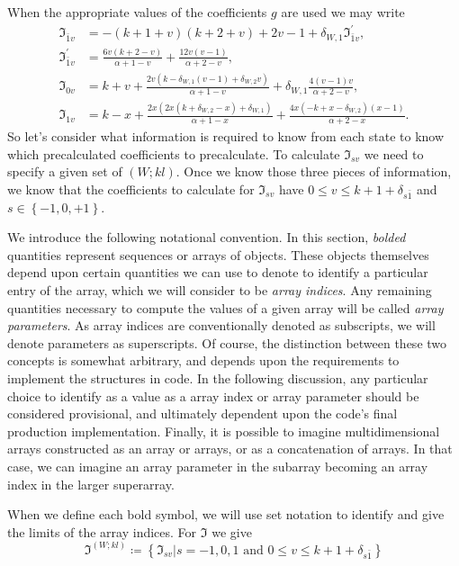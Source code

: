 When the appropriate values of the coefficients $g$ are used we may write
\begin{align}
\mathfrak{I}_{\bar{1}v}
    & =
        -(k+1+v)(k+2+v)+2v-1
        +
        \delta_{W,1}\mathfrak{I}_{\bar{1}v}^{\prime}
,\\
\mathfrak{I}_{\bar{1}v}^{\prime}
    & =
        \frac{6v(k+2-v)}{\alpha+1-v}
            +
        \frac{12v(v-1)}{\alpha+2-v}
,\\
\mathfrak{I}_{0v}
    & =
        k+v
            +
        \frac
        {2v\left(k-\delta_{W,1}\left(v-1\right)+\delta_{W,2}v\right)}
        {\alpha+1-v}
            +
        \delta_{W,1}\frac{4(v-1)v}{\alpha+2-v}
,\\
\mathfrak{I}_{1v}
    & =
        k-x
            +
        \frac{2x(2x(k+\delta_{W,2}-x)+\delta_{W,1})}{\alpha+1-x}
            +
        \frac{4x(-k+x-\delta_{W,2})(x-1)}{\alpha+2-x}
.
\end{align}
So let's consider what information is required to know from each state to know
which precalculated coefficients to precalculate. To calculate
$\mathfrak{I}_{sv}$ we need to specify a given set of $ \left(W;kl\right) $. Once
we know those three pieces of information, we know that the coefficients to
calculate for $\mathfrak{I}_{sv}$ have $ 0 \le v \le k + 1 + \delta_{s\bar{1}}$
and $ s \in \left\{-1,0,+1\right\}$.

We introduce the following notational convention. In this section, \emph{bolded}
quantities represent sequences or arrays of objects. These objects themselves
depend upon certain quantities we can use to denote to identify a particular
entry of the array, which we will consider to be \emph{array indices}. Any
remaining quantities necessary to compute the values of a given array will be
called \emph{array parameters}. As array indices are conventionally denoted as
subscripts, we will denote parameters as superscripts. Of course, the
distinction between these two concepts is somewhat arbitrary, and depends upon
the requirements to implement the structures in code. In the following
discussion, any particular choice to identify as a value as a array index or
array parameter should be considered provisional, and ultimately dependent upon
the code's final production implementation. Finally, it is possible to imagine
multidimensional arrays constructed as an array or arrays, or as a
concatenation of arrays. In that case, we can imagine an array parameter in the
subarray becoming an array index in the larger superarray.

When we define each bold symbol, we will use set notation to identify and give
the limits of the array indices. For $\bm{\mathfrak{I}}$ we give
\begin{equation}
\bm{\mathfrak{I}}^{\left(W;kl\right)}
    \coloneqq
        \left\{
            \mathfrak{I}_{sv}
                |
            s = -1,0,1 \text{ and }
            0 \le v \le k + 1 + \delta_{s\bar{1}}
        \right\}
\end{equation}

